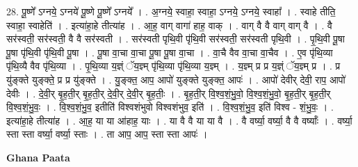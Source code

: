 \documentclass[17pt]{extarticle}
\begin{document}
28. पू॒ष्णे᳚ ऽग्नये॒ ऽग्नये॑ पू॒ष्णे पू॒ष्णे᳚ ऽग्नये᳚ । . अ॒ग्नये॒ स्वाहा॒ स्वाहा॒ ऽग्नये॒ ऽग्नये॒ स्वाहा᳚ । . स्वाहे तीति॒ स्वाहा॒ स्वाहेति॑ । . इत्या॑हा॒हे तीत्या॑ह । . आ॒ह॒ वाग् वागा॑ हाह॒ वाक् । . वाग् वै वै वाग् वाग् वै । . वै सर॑स्वती॒ सर॑स्वती॒ वै वै सर॑स्वती । . सर॑स्वती पृथि॒वी पृ॑थि॒वी सर॑स्वती॒ सर॑स्वती पृथि॒वी । . पृ॒थि॒वी पू॒षा पू॒षा पृ॑थि॒वी पृ॑थि॒वी पू॒षा । . पू॒षा वा॒चा वा॒चा पू॒षा पू॒षा वा॒चा । . वा॒चै वैव वा॒चा वा॒चैव । . ए॒व पृ॑थि॒व्या पृ॑थि॒व्यै वैव पृ॑थि॒व्या । . पृ॒थि॒व्या य॒ज्ञ्ं ॅय॒ज्ञ्म् पृ॑थि॒व्या पृ॑थि॒व्या य॒ज्ञ्म् । . य॒ज्ञ्म् प्र प्र य॒ज्ञ्ं ॅय॒ज्ञ्म् प्र । . प्र यु॑ङ्क्ते युङ्क्ते॒ प्र प्र यु॑ङ्क्ते । . यु॒ङ्क्त॒ आप॒ आपो॑ युङ्क्ते युङ्क्त॒ आपः॑ । . आपो॑ देवीर् देवी॒ राप॒ आपो॑ देवीः । . दे॒वी॒र् बृ॒ह॒ती॒र् बृ॒ह॒ती॒र् दे॒वी॒र् दे॒वी॒र् बृ॒ह॒तीः॒ । . बृ॒ह॒ती॒र् वि॒श्व॒शं॒भु॒वो॒ वि॒श्व॒शं॒भु॒वो॒ बृ॒ह॒ती॒र् बृ॒ह॒ती॒र् वि॒श्व॒शं॒भु॒वः॒ । . वि॒श्व॒शं॒भु॒व॒ इतीति॑ विश्वशंभुवो विश्वशंभुव॒ इति॑ । . वि॒श्व॒शं॒भु॒व॒ इति॑ विश्व - शं॒भु॒वः॒ । . इत्या॑हा॒हे तीत्या॑ह । . आ॒ह॒ या या आ॑हाह॒ याः । . या वै वै या या वै । . वै वर्ष्या॒ वर्ष्या॒ वै वै वर्ष्याः᳚ । . वर्ष्या॒ स्ता स्ता वर्ष्या॒ वर्ष्या॒ स्ताः । . ता आप॒ आप॒ स्ता स्ता आपः॑ । \newline

\textbf{Ghana Paata } \newline
\end{document}
